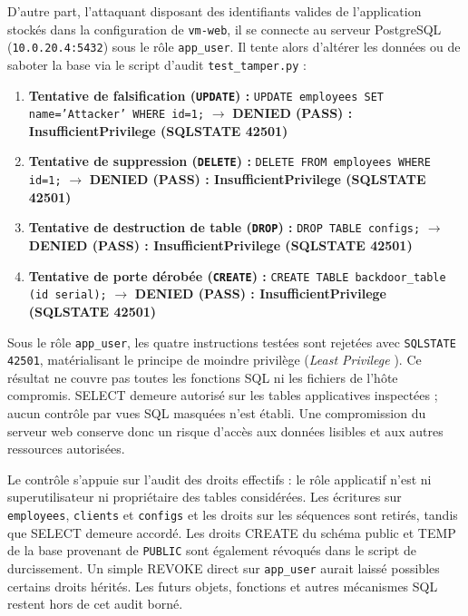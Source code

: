 \documentclass[a4paper,12pt]{report}
\begin{document}
D'autre part, l'attaquant disposant des identifiants valides de l'application stockés dans la configuration de \texttt{vm-web}, il se connecte au serveur PostgreSQL (\texttt{10.0.20.4:5432}) sous le rôle \texttt{app\_user}. Il tente alors d'altérer les données ou de saboter la base via le script d'audit \texttt{test\_tamper.py} :
\begin{enumerate}
\item \textbf{Tentative de falsification (\texttt{UPDATE}) :} \texttt{UPDATE employees SET name='Attacker' WHERE id=1;} $\rightarrow$ \textbf{DENIED (PASS) : InsufficientPrivilege (SQLSTATE 42501)}
\item \textbf{Tentative de suppression (\texttt{DELETE}) :} \texttt{DELETE FROM employees WHERE id=1;} $\rightarrow$ \textbf{DENIED (PASS) : InsufficientPrivilege (SQLSTATE 42501)}
\item \textbf{Tentative de destruction de table (\texttt{DROP}) :} \texttt{DROP TABLE configs;} $\rightarrow$ \textbf{DENIED (PASS) : InsufficientPrivilege (SQLSTATE 42501)}
\item \textbf{Tentative de porte dérobée (\texttt{CREATE}) :} \texttt{CREATE TABLE backdoor\_table (id serial);} $\rightarrow$ \textbf{DENIED (PASS) : InsufficientPrivilege (SQLSTATE 42501)}
\end{enumerate}

Sous le rôle \texttt{app\_user}, les quatre instructions testées sont rejetées avec \texttt{SQLSTATE 42501}, matérialisant le principe de moindre privilège (\textit{Least Privilege} \cite{saltzer1975}). Ce résultat ne couvre pas toutes les fonctions SQL ni les fichiers de l'hôte compromis. SELECT demeure autorisé sur les tables applicatives inspectées ; aucun contrôle par vues SQL masquées n'est établi. Une compromission du serveur web conserve donc un risque d'accès aux données lisibles et aux autres ressources autorisées.

Le contrôle s'appuie sur l'audit des droits effectifs : le rôle applicatif n'est ni superutilisateur ni propriétaire des tables considérées. Les écritures sur \texttt{employees}, \texttt{clients} et \texttt{configs} et les droits sur les séquences sont retirés, tandis que SELECT demeure accordé. Les droits CREATE du schéma public et TEMP de la base provenant de \texttt{PUBLIC} sont également révoqués dans le script de durcissement. Un simple REVOKE direct sur \texttt{app\_user} aurait laissé possibles certains droits hérités. Les futurs objets, fonctions et autres mécanismes SQL restent hors de cet audit borné.
\end{document}

